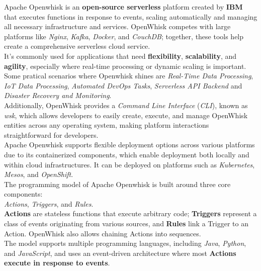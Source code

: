 Apache Openwhisk is an \textbf{open-source serverless} platform created by \textbf{IBM} that executes functions in response to events, scaling automatically and managing all necessary infrastructure and services. OpenWhisk competes with large platforms like \textit{Nginx}, \textit{Kafka}, \textit{Docker}, and \textit{CouchDB}; together, these tools help create a comprehensive serverless cloud service.\vspace{14pt}\\
It’s commonly used for applications that need \textbf{flexibility}, \textbf{scalability}, and \textbf{agility}, especially where real-time processing or dynamic scaling is important. Some pratical scenarios where Openwhisk shines are \textit{Real-Time Data Processing}, \textit{IoT Data Processing}, \textit{Automated DevOps Tasks}, \textit{Serverless API Backend} and \textit{Disaster Recovery and Monitoring}.\vspace{14pt}\\
Additionally, OpenWhisk provides a \textit{Command Line Interface} (\textit{CLI}), known as \textit{wsk}, which allows developers to easily create, execute, and manage OpenWhisk entities across any operating system, making platform interactions straightforward for developers.\vspace{14pt}\\
Apache Openwhisk supports flexible deployment options across various platforms due to its containerized components, which enable deployment both locally and within cloud infrastructures. It can be deployed on platforms such as \textit{Kubernetes}, \textit{Mesos}, and \textit{OpenShift}.\vspace{14pt}\\
The programming model of Apache Openwhisk is built around three core components:\\
\textit{Actions}, \textit{Triggers}, and \textit{Rules}.\vspace{14pt}\\
\textbf{Actions} are stateless functions that execute arbitrary code; \textbf{Triggers} represent a class of events originating from various sources, and \textbf{Rules} link a Trigger to an Action. OpenWhisk also allows chaining Actions into sequences.\vspace{14pt}\\
The model supports multiple programming languages, including \textit{Java}, \textit{Python}, and \textit{JavaScript}, and uses an event-driven architecture where most \textbf{Actions execute in response to events}.\cite{quevedo2019evaluating}\vspace{10pt}
